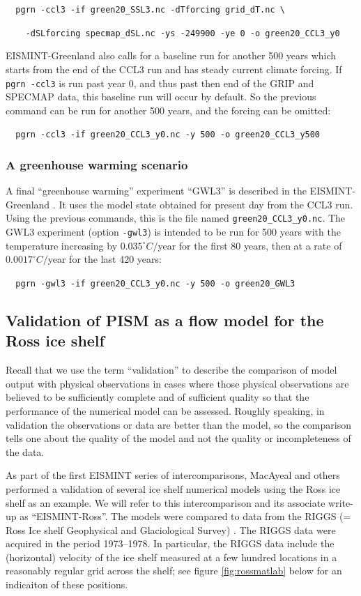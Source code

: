 \documentclass[11pt,final]{amsart}
\begin{document}
\verb|  pgrn -ccl3 -if green20_SSL3.nc -dTforcing grid_dT.nc \|

\verb|    -dSLforcing specmap_dSL.nc -ys -249900 -ye 0 -o green20_CCL3_y0|

\noindent EISMINT-Greenland also calls for a baseline run for another 500 years which starts from the end of the CCL3 run and has steady current climate forcing.  If \verb|pgrn -ccl3| is run past year 0, and thus past then end of the GRIP and SPECMAP data, this baseline run will occur by default.  So the previous command can be run for another 500 years, and the forcing can be omitted:

\verb|  pgrn -ccl3 -if green20_CCL3_y0.nc -y 500 -o green20_CCL3_y500|

\subsubsection{A greenhouse warming scenario}  A final ``greenhouse warming'' experiment ``GWL3'' is described in the EISMINT-Greenland \cite{RitzEISMINT}.  It uses the model state obtained for present day from the CCL3 run.  Using the previous commands, this is the file named \verb|green20_CCL3_y0.nc|.  The GWL3 experiment (option \verb|-gwl3|) is intended to be run for 500 years with the temperature increasing by $0.035^\circ C/$year for the first 80 years, then at a rate of $0.0017^\circ C/$year for the last 420 years:

\verb|  pgrn -gwl3 -if green20_CCL3_y0.nc -y 500 -o green20_GWL3|


\subsection{Validation of PISM as a flow model for the Ross ice shelf} Recall that we use the term ``validation'' to describe the comparison of model output with physical observations in cases where those physical observations are believed to be sufficiently complete and of sufficient quality so that the performance of the numerical model can be assessed.  Roughly speaking, in validation the observations or data are better than the model, so the comparison tells one about the quality of the model and not the quality or incompleteness of the data.

As part of the first EISMINT series of intercomparisons, MacAyeal and others \cite{MacAyealetal} performed a validation of several ice shelf numerical models using the Ross ice shelf as an example.  We will refer to this intercomparison and its associate write-up \cite{MacAyealetal} as ``EISMINT-Ross''.  The models were compared to data from the RIGGS (= Ross Ice shelf Geophysical and Glaciological Survey) \cite{RIGGS1,RIGGS2}.  The RIGGS data were acquired in the period 1973--1978.   In particular, the RIGGS data include the (horizontal) velocity of the ice shelf measured at a few hundred locations in a reasonably regular grid across the shelf; see figure \ref{fig:rossmatlab} below for an indicaiton of these positions.
\end{document}
